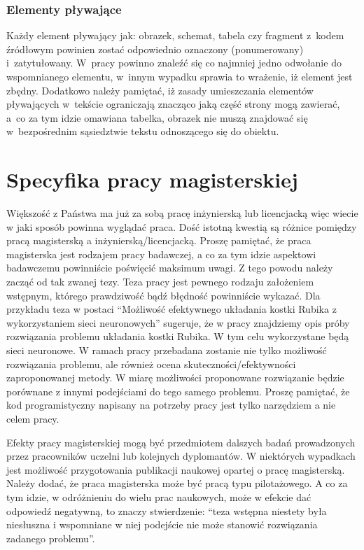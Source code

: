 \documentclass[12pt,a4paper]{article}
\begin{document}
\subsubsection{Elementy pływające}
Każdy element pływający jak: obrazek, schemat, tabela czy fragment z~kodem źródłowym powinien zostać odpowiednio oznaczony (ponumerowany) i~zatytułowany. W~pracy powinno znaleźć się co najmniej jedno odwołanie do wspomnianego elementu, w~innym wypadku sprawia to wrażenie, iż element jest zbędny. Dodatkowo należy pamiętać, iż zasady umieszczania elementów pływających w~tekście ograniczają znacząco jaką część strony mogą zawierać, a~co za tym idzie omawiana tabelka, obrazek nie muszą znajdować się w~bezpośrednim sąsiedztwie tekstu odnoszącego się do obiektu.

\section{Specyfika pracy magisterskiej}
Większość z Państwa ma już za sobą pracę inżynierską lub licencjacką więc wiecie w jaki sposób powinna wyglądać praca. Dość istotną kwestią są różnice pomiędzy pracą magisterską a inżynierską/licencjacką. Proszę pamiętać, że praca magisterska jest rodzajem pracy badawczej, a co za tym idzie aspektowi badawczemu powinniście poświęcić maksimum uwagi. Z tego powodu należy zacząć od tak zwanej tezy. Teza pracy jest pewnego rodzaju założeniem wstępnym, którego prawdziwość bądź błędność powinniście wykazać. Dla przykładu teza w postaci ``Możliwość efektywnego układania kostki Rubika z wykorzystaniem sieci neuronowych'' sugeruje, że w pracy znajdziemy opis próby rozwiązania problemu układania kostki Rubika. W tym celu wykorzystane będą sieci neuronowe. W ramach pracy przebadana zostanie nie tylko możliwość rozwiązania problemu, ale również ocena skuteczności/efektywności zaproponowanej metody. W miarę możliwości proponowane rozwiązanie będzie porównane z innymi podejściami do tego samego problemu. Proszę pamiętać, że kod programistyczny napisany na potrzeby pracy jest tylko narzędziem a nie celem pracy. 

Efekty pracy magisterskiej mogą być przedmiotem dalszych badań prowadzonych przez pracowników uczelni lub kolejnych dyplomantów. W niektórych wypadkach jest możliwość przygotowania publikacji naukowej opartej o pracę magisterską. Należy dodać, że praca magisterska może być pracą typu pilotażowego. A co za tym idzie, w odróżnieniu do wielu prac naukowych, może w efekcie dać odpowiedź negatywną, to znaczy stwierdzenie: ``teza wstępna niestety była niesłuszna i wspomniane w niej podejście nie może stanowić rozwiązania zadanego problemu''.
\end{document}
